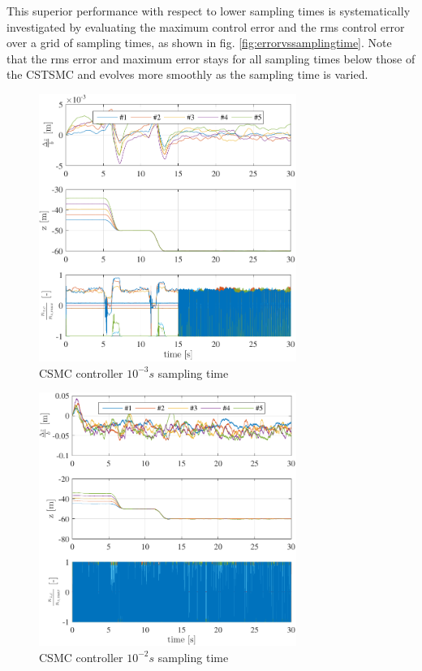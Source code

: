 \documentclass{ifacconf}
\begin{document}
This superior performance with respect to lower sampling times is systematically investigated by evaluating the maximum control error and the rms control error over a grid of sampling times, as shown in fig. \ref{fig:errorvssamplingtime}. Note that the rms error and maximum error stays for all sampling times below those of the CSTSMC and evolves more smoothly as the sampling time is varied.

\begin{figure}
\begin{center}
\includegraphics[width=8.4cm]{STSMC-1000Hz-TIMESCALESEPARATION-turbulence=1}    %
\caption{CSMC controller $10^{-3} s$ sampling time}
\label{fig:CSMC1000Hz}
\end{center}
\end{figure}

\begin{figure}
\begin{center}
\includegraphics[width=8.4cm]{STSMC-100Hz-TIMESCALESEPARATION-turbulence=1}    %
\caption{ CSMC controller $10^{-2} s$ sampling time}
\label{fig:CSMC100Hz}
\end{center}
\end{figure}
\end{document}
